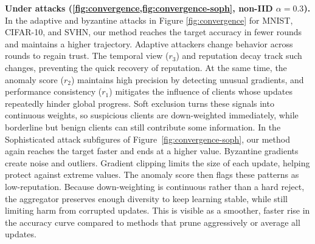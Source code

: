 \documentclass[lettersize,journal]{IEEEtran}
\begin{document}
{\textbf{Under attacks (\cref{fig:convergence,fig:convergence-soph}, non-IID $\alpha{=}0.3$).} In the adaptive and byzantine attacks in Figure \ref{fig:convergence} for MNIST, CIFAR-10, and SVHN, our method reaches the target accuracy in fewer rounds and maintains a higher trajectory. Adaptive attackers change behavior across rounds to regain trust. The temporal view ($r_3$) and reputation decay track such changes, preventing the quick recovery of reputation. At the same time, the anomaly score ($r_2$) maintains high precision by detecting unusual gradients, and performance consistency ($r_1$) mitigates the influence of clients whose updates repeatedly hinder global progress. Soft exclusion turns these signals into continuous weights, so suspicious clients are down-weighted immediately, while borderline but benign clients can still contribute some information.
In the Sophisticated attack subfigures of Figure~\ref{fig:convergence-soph}, our method again reaches the target faster and ends at a higher value. Byzantine gradients create noise and outliers. Gradient clipping limits the size of each update, helping protect against extreme values. The anomaly score then flags these patterns as low-reputation. Because down-weighting is continuous rather than a hard reject, the aggregator preserves enough diversity to keep learning stable, while still limiting harm from corrupted updates. This is visible as a smoother, faster rise in the accuracy curve compared to methods that prune aggressively or average all updates.

}
\end{document}
